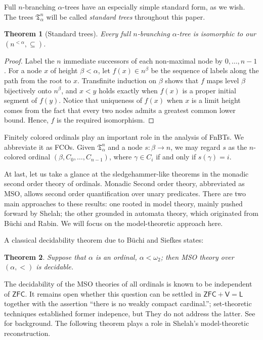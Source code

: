\documentclass{amsart}
\newtheorem{theorem}{Theorem}
\theoremstyle{definition}
\begin{document}
Full $n$-branching $\alpha$-trees have an especially simple standard form, as we wish. The trees $\mathfrak{T}_\alpha^n$ will be called \emph{standard trees} throughout this paper.
\begin{theorem}[Standard trees]\label{thm:standard-tree}
    Every full $n$-branching $\alpha$-tree is isomorphic to our $(n^{<\alpha},\subseteq)$.
\end{theorem}
\begin{proof}
    Label the $n$ immediate successors of each non‑maximal node by $0,\dots,n-1$. For a node $x$ of height $\beta<\alpha$, let $f(x)\in n^{\beta}$ be the sequence of labels along the path from the root to $x$. Transfinite induction on $\beta$ shows that $f$ maps level $\beta$ bijectively onto $n^{\beta}$, and $x<y$ holds exactly when $f(x)$ is a proper initial segment of $f(y)$. Notice that uniqueness of $f(x)$ when $x$ is a limit height comes from the fact that every two nodes admits a greatest common lower bound. Hence, $f$ is the required isomorphism.
\end{proof}

Finitely colored ordinals play an important role in the analysis of FnBTs. We abbreviate it as FCOs. Given $\mathfrak T_\alpha^n$ and a node $s\colon\beta\to n$, we may regard $s$ as the $n$-colored ordinal $(\beta,C_0,\dots,C_{n-1})$, where $\gamma\in C_i$ if and only if $s(\gamma)=i$.

At last, let us take a glance at the sledgehammer-like theorems in the monadic second order theory of ordinals. Monadic Second order theory, abbreviated as MSO, allows second order quantification over unary predicates. There are two main approaches to these results: one rooted in model theory, mainly pushed forward by Shelah; the other grounded in automata theory, which originated from B\"uchi and Rabin. We will focus on the model-theoretic approach here.\label{subsec:hardcoreprelim}

A classical decidability theorem due to B\"uchi and Siefkes \cite{Buchi1973} states:

\begin{theorem}\label{theorem:Decidability}
    Suppose that $\alpha$ is an ordinal, $\alpha<\omega_2$; then MSO theory over $(\alpha,<)$ is decidable.
\end{theorem}

The decidability of the MSO theories of all ordinals is known to be independent of $\mathsf{ZFC}$. It remains open whether this question can be settled in $\mathsf{ZFC}+\mathsf{V=L}$ together with the assertion ``there is no weakly compact cardinal.''; set-theoretic techniques established former indepence, but They do not address the latter.  See \cite{Shelah1975} for background. The following theorem plays a role in Shelah's model-theoretic reconstruction.
\end{document}

